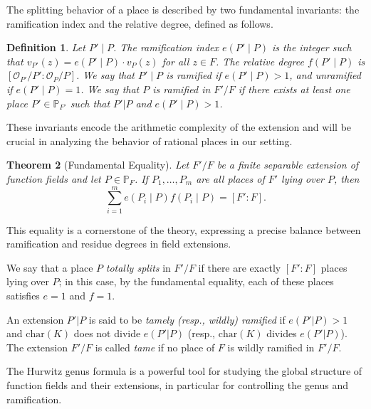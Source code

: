 \documentclass[1p,final]{elsarticle}
\newtheorem{theorem}{Theorem}[section]
\newtheorem{open problem}[theorem]{Open Problem}
\newtheorem{definition}[theorem]{Definition}
\begin{document}
\medskip

The splitting behavior of a place is described by two fundamental invariants: the ramification index and the relative degree, defined as follows.

\begin{definition}
	Let \( P' \mid P \). The ramification index \( e(P' \mid P) \) is the integer such that \( v_{P'}(z) = e(P' \mid P) \cdot v_P(z) \) for all \( z \in F \). The relative degree \( f(P' \mid P) \) is \( [\mathcal{O}_{P'}/P' : \mathcal{O}_P/P] \). We say that \( P' \mid P \) is ramified if $e(P' \mid P)>1$, and unramified if $e(P' \mid P)=1$. We say that $P$ is ramified in $F'/F$ if there exists at least one place $P'\in \mathbb{P}_{F'}$ such that $P'|P$ and $e(P' \mid P)>1$.
\end{definition}

These invariants encode the arithmetic complexity of the extension and will be crucial in analyzing the behavior of rational places in our setting.

\medskip

\begin{theorem}[Fundamental Equality]
	Let $F'/F$ be a finite separable extension of function fields and let \( P \in \mathbb{P}_F \). If \( P_1, \ldots, P_m \) are all places of \( F' \) lying over \( P \), then
	\[
	\sum_{i=1}^m e(P_i \mid P) f(P_i \mid P) = [F' : F].
	\]
\end{theorem}

This equality is a cornerstone of the theory, expressing a precise balance between ramification and residue degrees in field extensions.

\medskip

We say that a place \( P \) \emph{totally splits} in \( F'/F \) if there are exactly \( [F' : F] \) places lying over \( P \); in this case, by the fundamental equality, each of these places satisfies \( e = 1 \) and \( f = 1 \). 

An extension $P'|P$ is said to be \emph{tamely (resp., wildly) ramified} if $e(P'|P)>1$ and $\text{char}(K)$ does not divide $e(P'|P)$ (resp., $\text{char}(K)$ divides $e(P'|P)$). The extension $F'/F$ is called \emph{tame} if no place of $F$ is wildly ramified in $F'/F$.

\medskip

The Hurwitz genus formula is a powerful tool for studying the global structure of function fields and their extensions, in particular for controlling the genus and ramification.
\end{document}
